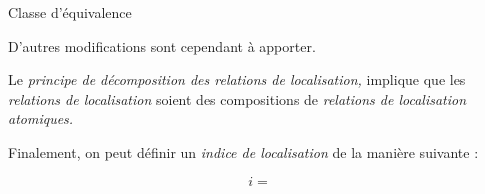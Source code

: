 Classe d'équivalence


D'autres modifications sont cependant à apporter.

Le \emph{principe de décomposition des relations de localisation,}
implique que les \emph{relations de localisation} soient des
compositions de \emph{relations de localisation atomiques.}



Finalement, on peut définir un \emph{indice de localisation} de la
manière suivante :

\begin{equation}
  i =
\end{equation}

